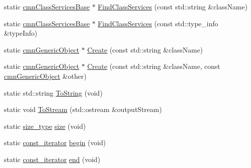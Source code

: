 \begin{DoxyCompactItemize}
\item 
static \hyperlink{classcmn_class_services_base}{cmn\-Class\-Services\-Base} $\ast$ \hyperlink{classcmn_class_register_a670426c761d6ef43df9bd67f4041b3da}{Find\-Class\-Services} (const std\-::string \&class\-Name)
\item 
static \hyperlink{classcmn_class_services_base}{cmn\-Class\-Services\-Base} $\ast$ \hyperlink{classcmn_class_register_a6ded0119eaa6ba31df685530ccf87d25}{Find\-Class\-Services} (const std\-::type\-\_\-info \&type\-Info)
\item 
static \hyperlink{classcmn_generic_object}{cmn\-Generic\-Object} $\ast$ \hyperlink{classcmn_class_register_af08b9d1e930098b7e760a3e13bd50cb0}{Create} (const std\-::string \&class\-Name)
\item 
static \hyperlink{classcmn_generic_object}{cmn\-Generic\-Object} $\ast$ \hyperlink{classcmn_class_register_ac96330fa28b74d90fb7625784fdbdee0}{Create} (const std\-::string \&class\-Name, const \hyperlink{classcmn_generic_object}{cmn\-Generic\-Object} \&other)
\item 
static std\-::string \hyperlink{classcmn_class_register_a29fdd14acb31a4fe05ce7fdbd463a31f}{To\-String} (void)
\item 
static void \hyperlink{classcmn_class_register_af25661aaf81242eae572112fc95b5b33}{To\-Stream} (std\-::ostream \&output\-Stream)
\item 
static \hyperlink{classcmn_class_register_ac90771194c85a9fff753d9d623071b01}{size\-\_\-type} \hyperlink{classcmn_class_register_a45356688a8fe87798fd8e2143d6f768c}{size} (void)
\item 
static \hyperlink{classcmn_class_register_aacfef62640c83b00064eba6c1f667e26}{const\-\_\-iterator} \hyperlink{classcmn_class_register_a97b89ca18a8fa10f083c000d259e8b82}{begin} (void)
\item 
static \hyperlink{classcmn_class_register_aacfef62640c83b00064eba6c1f667e26}{const\-\_\-iterator} \hyperlink{classcmn_class_register_afa8cb2f94da62294a96d7bfd1ba1185f}{end} (void)
\end{DoxyCompactItemize}
